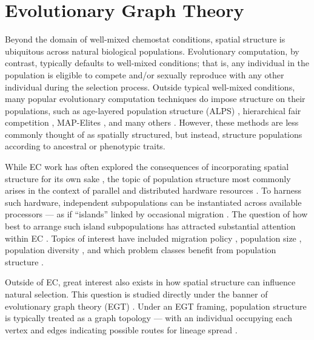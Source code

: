 \section{Evolutionary Graph Theory}
\label{sec:egt}

Beyond the domain of well-mixed chemostat conditions, spatial structure is ubiquitous across natural biological populations.
Evolutionary computation, by contrast, typically defaults to well-mixed conditions; that is, any individual in the population is eligible to compete and/or sexually reproduce with any other individual during the selection process. %
Outside typical well-mixed conditions, many popular evolutionary computation techniques do impose structure on their populations, such as age-layered population structure (ALPS) \citep{hornby2006alps}, hierarchical fair competition \citep{hu2005hierarchical}, MAP-Elites \citep{mouret2015illuminating}, and many others \citep{TODO}.
However, these methods are less commonly thought of as spatially structured, but instead, structure populations according to ancestral or phenotypic traits.

While EC work has often explored the consequences of incorporating spatial structure for its own sake
\citep{tomassini2005spatially,simon2008biogeographybased}, the topic of population structure most commonly arises in the context of parallel and distributed hardware resources \citep{cantupaz1999scalability}.
To harness such hardware, independent subpopulations can be instantiated across available processors --- as if ``islands'' linked by occasional migration \citep{cohoon1987punctuated,grosso1985computer,tanese1989distributed}.
The question of how best to arrange such island subpopulations has attracted substantial attention within EC \citep{whitley1999island,cantupaz1999topologies,rucinski2010impact}.
Topics of interest have included migration policy \citep{cantupaz2001migration,cantupaz1999topologies}, population size \citep{whitley1999island,goldberg1989sizing,cantupaz2001efficient}, population diversity \citep{tanese1989distributed,whitley1999island}, and which problem classes benefit from population structure \citep{lassig2013design}.

Outside of EC, great interest also exists in how spatial structure can influence natural selection.
This question is studied directly under the banner of evolutionary graph theory (EGT) \citep{lieberman2005evolutionary}.
Under an EGT framing, population structure is typically treated as a graph topology --- with an individual occupying each vertex and edges indicating possible routes for lineage spread \citep{pattni2015evolutionary}.

